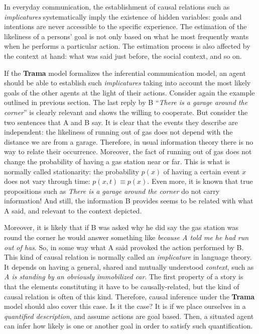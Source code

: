 \documentclass[
		twoside,openright,titlepage,numbers=noenddot,manychapters,
		headinclude,%
                footinclude=false,cleardoublepage=empty,
                BCOR=5mm,
		fontsize=11pt, %
                 enabledeprecatedfontcommands]{scrreprt}
\begin{document}
In everyday communication, the establishment of causal relations such as  \emph{implicatures} systematically imply the existence of hidden variables: goals and intentions are never accessible to the specific experience. The estimation of the likeliness of a persons' goal is not only based on what he most frequently wants when he performs a particular action. The estimation process is also affected by  the context at hand: what was said just before, the social context, and so on. 

If the \textbf{Trama} model formalizes the inferential communication model, an agent should be able to establish such \emph{implicatures} taking into account the most likely goals of the other agents at the light of their actions. Consider again the example outlined in previous section.
The last reply by B ``\emph{There is a garage around the corner}'' is clearly relevant and shows the willing to cooperate. But consider the two sentences that A and B say. It is clear that the events they describe are independent: the likeliness of running out of gas does not depend with the distance we are from a garage. Therefore, in usual information theory there is no way to relate their occurrence. Moreover, the fact of running out of gas does not change the probability of having a gas station near or far. This is what is normally called stationarity: the probability $p(x)$ of having a certain event $x$ does not vary through time: $p(x,t) \equiv p(x)$. Even more, it is known \cite[]{bremer2003ltc} that true propositions such as \emph{There is a garage around the corner} do not carry information!  And still, the information B provides seems to be related with what A said, and relevant to the context depicted.

Moreover, it is likely that if B was asked why he did say the gas station was round the corner he would answer something like \emph{because A told me he had run out of has}. So, in some way what A said provoked the action performed by B. This kind of causal relation is normally called an \emph{implicature} in language theory. It depends on having a general, shared and mutually understood \emph{context}, such as \emph{
A is standing by an obviously immobilized car}. The first property of a story is that the elements constituting it have to be causally-related, but the kind of causal relation is often of this kind. Therefore, causal inference under the \textbf{Trama} model should also cover this case. Is it the case? It is if we place ourselves in a \emph{quantified description}, and assume actions are goal based. Then, a situated agent can infer how likely is one or another goal in order to satisfy such quantification.  %
\end{document}

